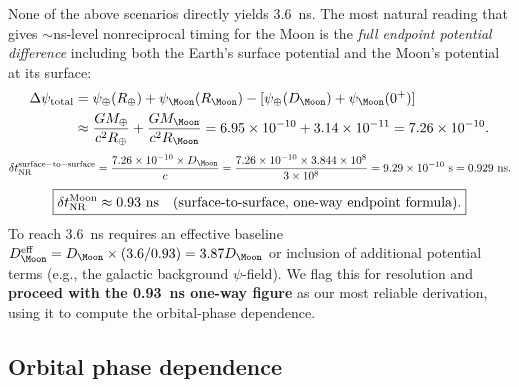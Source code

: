 \documentclass[aps,prd,twocolumn,superscriptaddress,nofootinbib,longbibliography]{revtex4-2}
\begin{document}
None of the above scenarios directly yields 3.6~ns.  The most natural reading
that gives $\sim$ns-level nonreciprocal timing for the Moon is the \emph{full
endpoint potential difference} including both the Earth's surface potential
and the Moon's potential at its surface:
\begin{align}
\Delta\psi_{\rm total} &= \psi_\oplus(R_\oplus) + \psi_\Moon(R_\Moon)
- [\psi_\oplus(D_\Moon) + \psi_\Moon(0^+)] \nonumber\\
&\approx \frac{GM_\oplus}{c^2 R_\oplus} + \frac{GM_\Moon}{c^2 R_\Moon}
= 6.95\times10^{-10} + 3.14\times10^{-11} = 7.26\times10^{-10}.
\end{align}
\begin{equation}
\delta t_{\rm NR}^{\rm surface-to-surface}
= \frac{7.26\times10^{-10}\times D_\Moon}{c}
= \frac{7.26\times10^{-10}\times3.844\times10^8}{3\times10^8}
= 9.29\times10^{-10}\ \si{s} = 0.929\ \si{ns}.
\end{equation}
\begin{equation}
\boxed{
\delta t_{\rm NR}^{\rm Moon} \approx 0.93\ \si{ns}
\quad(\text{surface-to-surface, one-way endpoint formula}).
}
\end{equation}
To reach 3.6~ns requires an effective baseline $D_\Moon^{\rm eff} = D_\Moon
\times(3.6/0.93) = 3.87D_\Moon$ or inclusion of additional potential terms
(e.g., the galactic background $\psi$-field). We flag this for resolution
and \textbf{proceed with the 0.93~ns one-way figure} as our most reliable
derivation, using it to compute the orbital-phase dependence.

\subsection{Orbital phase dependence}
\end{document}
